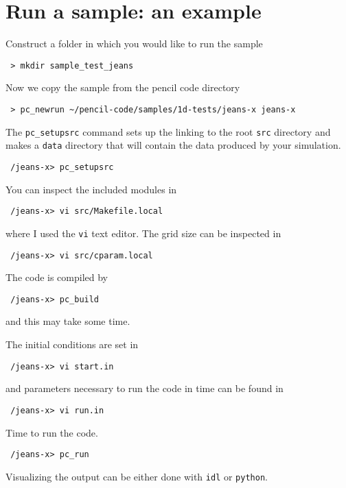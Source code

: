 \documentclass[a4paper,12pt]{article}
\begin{document}
\section{Run a sample: an example}

Construct a folder in which you would like to run the sample
\begin{verbatim}
 > mkdir sample_test_jeans
\end{verbatim}

Now we copy the sample from the pencil code directory
\begin{verbatim}
 > pc_newrun ~/pencil-code/samples/1d-tests/jeans-x jeans-x
\end{verbatim}

The \verb|pc_setupsrc| command sets up the linking to the root \verb|src|
directory and makes a
\verb|data| directory that will contain the data produced by your simulation.
\begin{verbatim}
 /jeans-x> pc_setupsrc
\end{verbatim}

You can inspect the included modules in
\begin{verbatim}
 /jeans-x> vi src/Makefile.local 
\end{verbatim}
where I used the \verb|vi| text editor. The grid size can be inspected in 
\begin{verbatim}
 /jeans-x> vi src/cparam.local 
\end{verbatim}

The code is compiled by
\begin{verbatim}
 /jeans-x> pc_build
\end{verbatim}
and this may take some time.

The initial conditions are set in
\begin{verbatim}
 /jeans-x> vi start.in
\end{verbatim}

and parameters necessary to run the code in time can be found in
\begin{verbatim}
 /jeans-x> vi run.in
\end{verbatim}

Time to run the code. 
\begin{verbatim}
 /jeans-x> pc_run
\end{verbatim}

Visualizing the output can be either done with \verb|idl| or \verb|python|.
\end{document}
